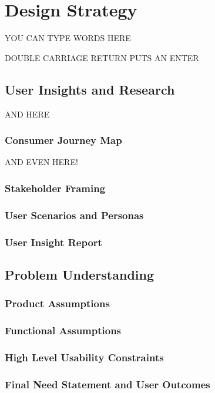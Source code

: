 \documentclass[a4paper, 10pt]{article}
\begin{document}
\begin{titlepage}
\end{titlepage}

\pagebreak{}

\tableofcontents

\pagebreak{}

\section{Design Strategy}
	YOU CAN TYPE WORDS HERE 
	
	DOUBLE CARRIAGE RETURN PUTS AN ENTER
	\subsection{User Insights and Research}
		AND HERE
		\subsubsection{Consumer Journey Map}
			AND EVEN HERE!
		\subsubsection{Stakeholder Framing}
			
		\subsubsection{User Scenarios and Personas}
		\subsubsection{User Insight Report}
	\subsection{Problem Understanding}
		\subsubsection{Product Assumptions}
		\subsubsection{Functional Assumptions}
		\subsubsection{High Level Usability Constraints}
		\subsubsection{Final Need Statement and User Outcomes}
\end{document}
